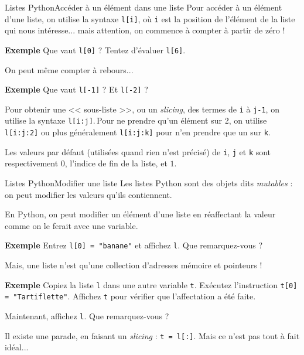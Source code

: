 \documentclass[10pt]{beamer}
\begin{document}
\begin{frame}[fragile]{Listes Python}{Accéder à un élément dans une liste}
	Pour accéder à un élément d'une liste, on utilise la syntaxe \verb|l[i]|, où \verb|i| est la position de l'élément de la liste qui nous intéresse... mais attention, on commence à compter à partir de zéro !
	\pause
	
	\begin{block}{\textbf{Exemple}}
		Que vaut \verb|l[0]| ? Tentez d'évaluer \verb|l[6]|.
	\end{block}
	\pause
	
	On peut même compter à rebours...
	\begin{block}{\textbf{Exemple}}
		Que vaut \verb|l[-1]| ? Et \verb|l[-2]| ?
	\end{block}
	\pause
	
	Pour obtenir une << sous-liste >>, ou un \textit{slicing}, des termes de \verb|i| à \verb|j-1|, on utilise la syntaxe \verb|l[i:j]|.\pause \,Pour ne prendre qu'un élément sur 2, on utilise \verb|l[i:j:2]| ou plus généralement \verb|l[i:j:k]| pour n'en prendre que un sur \verb|k|.\pause 
	
	Les valeurs par défaut (utilisées quand rien n'est précisé) de \verb|i|, \verb|j| et \verb|k| sont respectivement $0$, l'indice de fin de la liste, et $1$.
\end{frame}


\begin{frame}[fragile]{Listes Python}{Modifier une liste}
	Les listes Python sont des objets dits \textit{mutables} : on peut modifier les valeurs qu'ils contiennent.
	\pause
	
	En Python, on peut modifier un élément d'une liste en réaffectant la valeur comme on le ferait avec une variable.
	\begin{block}{\textbf{Exemple}}
		Entrez \verb|l[0] = "banane"| et affichez \verb|l|. Que remarquez-vous ?
	\end{block}
	\pause
	
	Mais, une liste n'est qu'une collection d'adresses mémoire et pointeurs ! 
	\begin{block}{\textbf{Exemple}}
	Copiez la liste \verb|l| dans une autre variable \verb|t|. Exécutez l'instruction \verb|t[0] = "Tartiflette"|. Affichez \verb|t| pour vérifier que l'affectation a été faite.
	\pause
	
	Maintenant, affichez \verb|l|. Que remarquez-vous ?
	\end{block}
	
	Il existe une parade, en faisant un \textit{slicing} : \verb|t = l[:]|. Mais ce n'est pas tout à fait idéal...
\end{frame}
\end{document}
